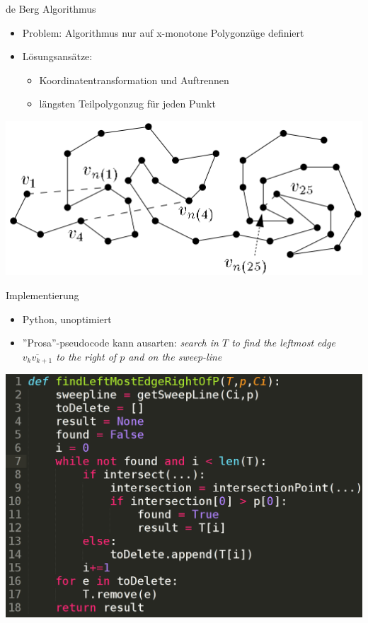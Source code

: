 \documentclass[14pt]{beamer}
\begin{document}
\begin{frame}{de Berg Algorithmus}
  \begin{itemize}
  	\item Problem: Algorithmus nur auf x-monotone Polygonzüge definiert
	\item Lösungsansätze:
		\begin{itemize}
			\item Koordinatentransformation und Auftrennen
			\item längsten Teilpolygonzug für jeden Punkt
		\end{itemize}
  \end{itemize}
\includegraphics[width=1.0\textwidth]{img/determineSubchain.png}  
\end{frame}

\begin{frame}{Implementierung}
\begin{itemize}
	\item Python, unoptimiert
	\item ''Prosa''-pseudocode kann ausarten: \emph{search in $T$ to find the leftmost edge $\overline{v_kv_{k+1}}$ to the right of $p$ and on the
sweep-line}
\end{itemize}

\includegraphics[width=.8\textwidth,center]{img/implvspseudo.png}
\end{frame}
\end{document}

